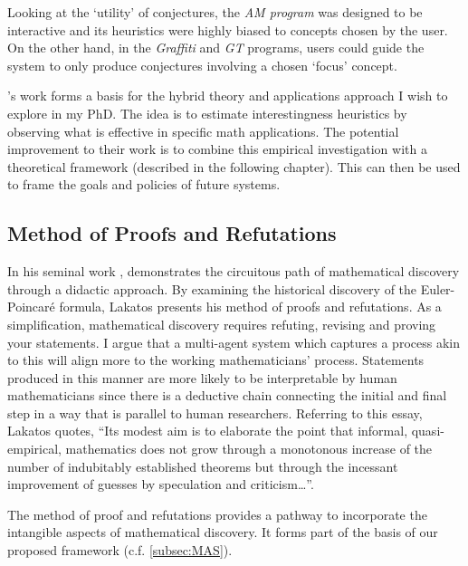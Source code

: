 Looking at the `utility' of conjectures, the \textit{AM program} was designed to be interactive and its heuristics were highly biased to concepts chosen by the user. On the other hand, in the \textit{Graffiti} and \textit{GT} programs, users could guide the system to only produce conjectures involving a chosen `focus' concept.
\par 
\citeauthor{coltonNotionInterestingnessAutomated2000}'s work forms a basis for the hybrid theory and applications approach I wish to explore in my PhD. The idea is to estimate interestingness heuristics by observing what is effective in specific math applications. The potential improvement to their work is to combine this empirical investigation with a theoretical framework (described in the following chapter). This can then be used to frame the goals and policies of future systems.

\subsection{Method of Proofs and Refutations}
\label{sec:method-proofs-refutations}
In his seminal work \cite{Lakatos_Worrall_Zahar_1976}, \citeauthor{Lakatos_Worrall_Zahar_1976} demonstrates the circuitous path of mathematical discovery through a didactic approach. By examining the historical discovery of the Euler-Poincar\'e formula, Lakatos presents his method of proofs and refutations. As a simplification, mathematical discovery requires refuting, revising and proving your statements.
I argue that a multi-agent system which captures a process akin to this will align more to the working mathematicians' process. Statements produced in this manner are more likely to be interpretable by human mathematicians since there is a deductive chain connecting the initial and final step in a way that is parallel to human researchers.
Referring to this essay, Lakatos quotes, ``Its modest aim is to elaborate the point that informal, quasi-empirical, mathematics does not grow through a monotonous increase of the number of indubitably established theorems but through the incessant improvement of guesses by speculation and criticism\dots''.
\par The method of proof and refutations provides a pathway to incorporate the intangible aspects of mathematical discovery. It forms part of the basis of our proposed framework (c.f. \ref{subsec:MAS}). 

